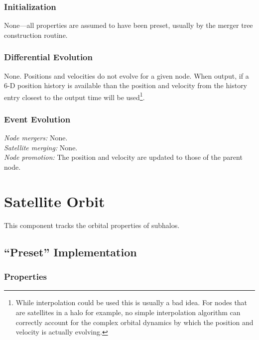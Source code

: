 \subsubsection{Initialization}

None---all properties are assumed to have been preset, usually by the merger tree construction routine.

\subsubsection{Differential Evolution}

None. Positions and velocities do not evolve for a given node. When output, if a 6-D position history is available than the position and velocity from the history entry closest to the output time will be used\footnote{While interpolation could be used this is usually a bad idea. For nodes that are satellites in a halo for example, no simple interpolation algorithm can correctly account for the complex orbital dynamics by which the position and velocity is actually evolving.}.

\subsubsection{Event Evolution}

\noindent\emph{Node mergers:} None.\\

\noindent\emph{Satellite merging:} None.\\

\noindent\emph{Node promotion:} The position and velocity are updated to those of the parent node.\\

\section{Satellite Orbit}

This \gls{component} tracks the orbital properties of subhalos.

\subsection{``Preset'' Implementation}

\subsubsection{Properties}

